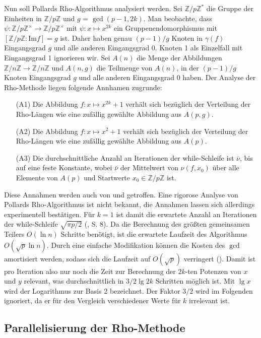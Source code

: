 \documentclass[a4paper, 10pt, ngerman]{article}
\newcommand{\Z}{\mathbb{Z}}
\begin{document}
\noindent Nun soll Pollards Rho-Algorithmus analysiert werden. Sei $\Z/p\Z^*$ die Gruppe der Einheiten in $\Z/p\Z$ und $g$ = $\gcd(p - 1, 2k)$. Man beobachte, dass $\psi : \Z/p\Z^\times \to \Z/p\Z^\times$ mit $\psi : x \mapsto x^{2k}$ ein Gruppenendomorphismus mit $[\Z/p\Z : \text{Im} f] = g$ ist. Daher haben genau $(p - 1) / g$ Knoten in $\gamma(f)$ Eingangsgrad $g$ und alle anderen Eingangsgrad 0. Knoten 1 als Einzelfall mit Eingangsgrad 1 ignorieren wir. Sei $A(n)$ die Menge der Abbildungen $\Z/n\Z \to \Z/n\Z$ und $A(n, g)$ die Teilmenge von $A(n)$, in der $(p - 1) / g$ Knoten Eingangsgrad $g$ und alle anderen Eingangsgrad 0 haben. Der Analyse der Rho-Methode liegen folgende Annhamen zugrunde:
\begin{itemize}
    \item[(A1)] Die Abbildung $f : x \mapsto x^{2k} + 1$ verhält sich bezüglich der Verteilung der Rho-Längen wie eine zufällig gewählte Abbildung aus $A(p, g)$.
    \item[(A2)] Die Abbildung $f : x \mapsto x^{2} + 1$ verhält sich bezüglich der Verteilung der Rho-Längen wie eine zufällig gewählte Abbildung aus $A(p)$.
    \item[(A3)] Die durchschnittliche Anzahl an Iterationen der while-Schleife ist $\overline \nu$, bis auf eine feste Konstante, wobei $\overline \nu$ der Mittelwert von $\nu(f, x_0)$ über alle Elemente von $A(p)$ und Startwerte $x_0 \in \Z/p\Z$ ist.
\end{itemize}
Diese Annahmen werden auch von \cite{pol75} und \cite{bp81} getroffen. Eine rigorose Analyse von Pollards Rho-Algorithmus ist nicht bekannt, die Annahmen lassen sich allerdings experimentell bestätigen. Für $k = 1$ ist damit die erwartete Anzahl an Iterationen der while-Schleife $\sqrt{\pi p / 2}$ (\cite{knu98}, S. 8). Da die Berechnung des größten gemeinsamen Teilers $O(\ln n)$ Schritte benötigt, ist die erwartete Laufzeit des Algorithmus $O(\sqrt p \ln n)$. Durch eine einfache Modifikation können die Kosten des $\gcd$ amortisiert werden, sodass sich die Laufzeit auf $O(\sqrt p)$ verringert (\cite{bre80}). Damit ist pro Iteration also nur noch die Zeit zur Berechnung der $2k$-ten Potenzen von $x$ und $y$ relevant, was durchschnittlich in $3/2 \lg 2k$ Schritten möglich ist. Mit $\lg x$ wird der Logarithmus zur Basis 2 bezeichnet. Der Faktor $3/2$ wird im Folgenden ignoriert, da er für den Vergleich verschiedener Werte für $k$ irrelevant ist.

\subsection{Parallelisierung der Rho-Methode}
\end{document}
